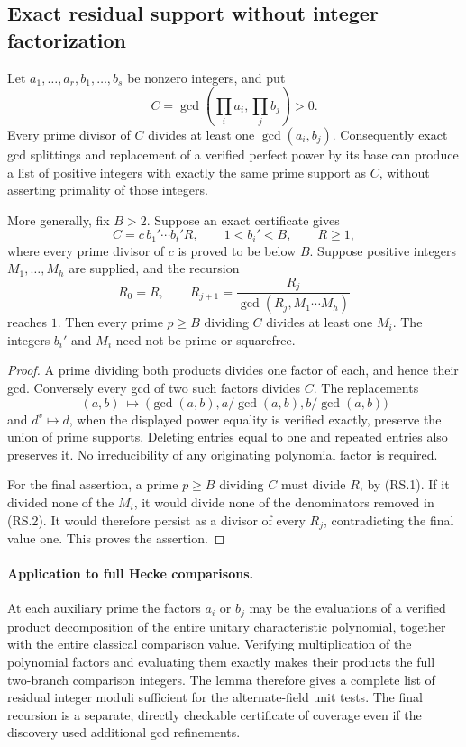 \subsection{Exact residual support without integer factorization}
\label{sec:residual-support-gcd}

\begin{lemma}\label{lem:comparison-support-gcd}
Let \(a_1,\ldots,a_r,b_1,\ldots,b_s\) be nonzero integers, and put
\[
 C=\gcd\left(\prod_i a_i,\prod_j b_j\right)>0.
\]
Every prime divisor of \(C\) divides at least one
\(\gcd(a_i,b_j)\). Consequently exact gcd splittings and
replacement of a verified perfect power by its base can
produce a list of positive integers with exactly the same
prime support as \(C\), without asserting primality of those
integers.

More generally, fix \(B>2\). Suppose an exact certificate gives
\[
 C=c\,b_1'\cdots b_t'R,\qquad
 1<b_i'<B,\qquad R\ge1,
 \tag{RS.1}
\]
where every prime divisor of \(c\) is proved to be below \(B\).
Suppose positive integers \(M_1,\ldots,M_h\) are supplied, and
the recursion
\[
 R_0=R,\qquad
 R_{j+1}=\frac{R_j}{\gcd(R_j,M_1\cdots M_h)}
 \tag{RS.2}
\]
reaches \(1\). Then every prime \(p\ge B\) dividing \(C\)
divides at least one \(M_i\). The integers \(b_i'\) and \(M_i\)
need not be prime or squarefree.
\end{lemma}

\begin{proof}
A prime dividing both products divides one factor of each,
and hence their gcd. Conversely every gcd of two such factors
divides \(C\). The replacements
\[
 (a,b)\ \longmapsto\
 \bigl(\gcd(a,b),a/\gcd(a,b),b/\gcd(a,b)\bigr)
\]
and \(d^v\mapsto d\), when the displayed power equality is
verified exactly, preserve the union of prime supports.
Deleting entries equal to one and repeated entries also
preserves it. No irreducibility of any originating polynomial
factor is required.

For the final assertion, a prime \(p\ge B\) dividing \(C\)
must divide \(R\), by (RS.1). If it divided none of the \(M_i\),
it would divide none of the denominators removed in (RS.2).
It would therefore persist as a divisor of every \(R_j\),
contradicting the final value one. This proves the assertion.
\end{proof}

\paragraph{Application to full Hecke comparisons.}
At each auxiliary prime the factors \(a_i\) or \(b_j\) may be
the evaluations of a verified product decomposition of the
entire unitary characteristic polynomial, together with the
entire classical comparison value. Verifying multiplication
of the polynomial factors and evaluating them exactly makes
their products the full two-branch comparison integers.
The lemma therefore gives a complete list of residual
integer moduli sufficient for the alternate-field unit tests.
The final recursion is a separate, directly checkable
certificate of coverage even if the discovery used additional
gcd refinements.
